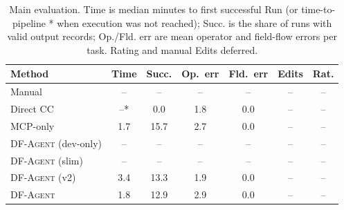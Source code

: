 \begin{table}[t]
\centering
\small
\setlength{\tabcolsep}{3pt}
\begin{tabular}{lcccccc}
\toprule
Method & Time & Succ. & Op.\ err & Fld.\ err & Edits & Rat. \\
\midrule
Manual & -- & -- & -- & -- & -- & -- \\
Direct CC & --* & 0.0 & 1.8 & 0.0 & -- & -- \\
MCP-only & 1.7 & 15.7 & 2.7 & 0.0 & -- & -- \\
\textsc{DF-Agent} (dev-only) & -- & -- & -- & -- & -- & -- \\
\textsc{DF-Agent} (slim) & -- & -- & -- & -- & -- & -- \\
\textsc{DF-Agent} (v2) & 3.4 & 13.3 & 1.9 & 0.0 & -- & -- \\
\textsc{DF-Agent} & 1.8 & 12.9 & 2.9 & 0.0 & -- & -- \\
\bottomrule
\end{tabular}
\caption{Main evaluation. Time is median minutes to first successful Run (or time-to-pipeline * when execution was not reached); Succ. is the share of runs with valid output records; Op./Fld. err are mean operator and field-flow errors per task. Rating and manual Edits deferred.}
\label{tab:eval}
\end{table}
